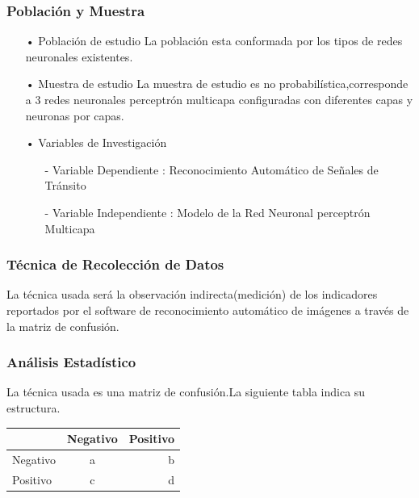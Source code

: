 \documentclass[a4paper, 12pt]{article}
\begin{document}
\subsubsection{Población y Muestra}
\begin{enumerate}
\item[•] Población de estudio
\vskip 0.1cm
La población esta conformada por los tipos de redes neuronales existentes.\par
\item[•] Muestra de estudio
\vskip 0.1cm
La muestra de estudio es no probabilística,corresponde a 3 redes neuronales perceptrón multicapa configuradas con diferentes capas y neuronas por capas.\par
\item[•] Variables de Investigación
\begin{enumerate}
\item[-] Variable Dependiente : 
Reconocimiento Automático de Señales de Tránsito
\item[-] Variable Independiente : 
Modelo de la Red Neuronal perceptrón Multicapa

\vskip 0.1cm

\end{enumerate}
\end{enumerate}

\subsubsection{Técnica de Recolección de Datos}
La técnica usada será la observación indirecta(medición) de los indicadores reportados por el software de reconocimiento automático de imágenes a través de la matriz de confusión.

\subsubsection{Análisis Estadístico}
La técnica usada es una matriz de confusión.La siguiente tabla indica su estructura.
\vskip 0.1cm
\begin{center}
\begin{tabular*}{5.8 cm}{||l | c | r||}
\hline
&Negativo&Positivo\\
\hline
Negativo&a&b\\
\hline
Positivo&c&d\\
\hline
\end{tabular*}
\end{center}

\vskip 0.1cm
\end{document}
